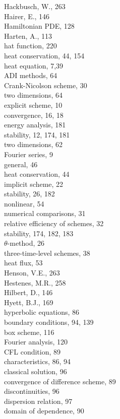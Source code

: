 \documentclass[10pt]{article}
\begin{document}
Hackbusch, W., 263\\
Hairer, E., 146\\
Hamiltonian PDE, 128\\
Harten, A., 113\\
hat function, 220\\
heat conservation, 44, 154\\
heat equation, 7,39\\
ADI methods, 64\\
Crank-Nicolson scheme, 30\\
two dimensions, 64\\
explicit scheme, 10\\
convergence, 16, 18\\
energy analysis, 181\\
stability, 12, 174, 181\\
two dimensions, 62\\
Fourier series, 9\\
general, 46\\
heat conservation, 44\\
implicit scheme, 22\\
stability, 26, 182\\
nonlinear, 54\\
numerical comparisons, 31\\
relative efficiency of schemes, 32\\
stability, 174, 182, 183\\
\(\theta\)-method, 26\\
three-time-level schemes, 38\\
heat flux, 53\\
Henson, V.E., 263\\
Hestenes, M.R., 258\\
Hilbert, D., 146\\
Hyett, B.J., 169\\
hyperbolic equations, 86\\
boundary conditions, 94, 139\\
box scheme, 116\\
Fourier analysis, 120\\
CFL condition, 89\\
characteristics, 86, 94\\
classical solution, 96\\
convergence of difference scheme, 89\\
discontinuities, 96\\
dispersion relation, 97\\
domain of dependence, 90\\
\end{document}
